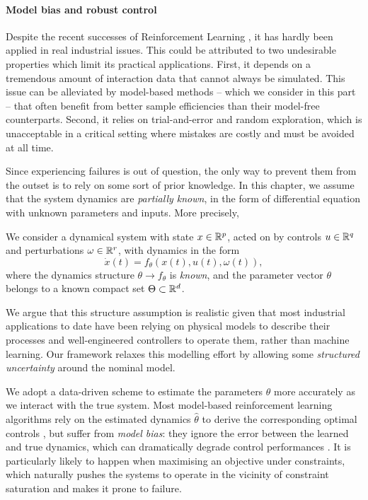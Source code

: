 \paragraph{Model bias and robust control}
Despite the recent successes of Reinforcement Learning \citep[e.g.][]{mnih2015humanlevel,Silver1140}, it has hardly been applied in real industrial issues. This could be attributed to two undesirable properties which limit its practical applications. First, it depends on a tremendous amount of interaction data that cannot always be simulated. This issue can be alleviated by model-based methods -- which we consider in this part -- that often benefit from better sample efficiencies than their model-free counterparts. Second, it relies on trial-and-error and random exploration, which is unacceptable in a critical setting where mistakes are costly and must be avoided at all time.

Since experiencing failures is out of question, the only way to prevent them from the outset is to rely on some sort of prior knowledge. In this chapter, we assume that the system dynamics are \emph{partially known}, in the form of differential equation with unknown parameters and inputs. More precisely,

\begin{assumption}
\begin{leftbar}[assumptionbar]
We consider a dynamical system with state $x\in\mathbb{R}^p$, acted on by controls $u\in\mathbb{R}^q$ and perturbations $\omega\in\mathbb{R}^r$, with dynamics in the form
\begin{equation*}
\dot{x}(t) = f_\theta\left(x(t),u(t),\omega(t)\right),
\end{equation*}
where the dynamics structure $\theta\rightarrow f_\theta$ is \emph{known}, and the parameter vector $\theta$ belongs to a known compact set $\Theta \subset \mathbb{R}^d$.
\end{leftbar}
\end{assumption}
\noindent We argue that this structure assumption is realistic given that most industrial applications to date have been relying on physical models to describe their processes and well-engineered controllers to operate them, rather than machine learning. Our framework relaxes this modelling effort by allowing some \emph{structured uncertainty} around the nominal model.

We adopt a data-driven scheme to estimate the parameters $\theta$ more accurately as we interact with the true system. Most model-based reinforcement learning algorithms rely on the estimated dynamics $\hat{\theta}$ to derive the corresponding optimal controls \citep[e.g.][]{Lenz2015,Levine2015}, but suffer from \emph{model bias}: they ignore the error between the learned and true dynamics, which can dramatically degrade control performances \citep{Doyle1978,Schneider1997}. It is particularly likely to happen when maximising an objective under constraints, which naturally pushes the systems to operate in the vicinity of constraint saturation and makes it prone to failure.

